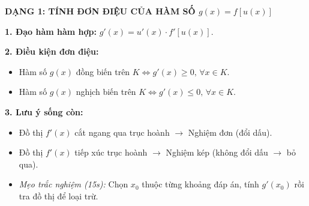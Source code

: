 \documentclass[12pt, a4paper]{article}
\begin{document}

\begin{theorybox}
    \textbf{\textcolor{deepblue}{\large DẠNG 1: TÍNH ĐƠN ĐIỆU CỦA HÀM SỐ $g(x) = f[u(x)]$}}
    \par\vspace{0.15cm}
    \textbf{1. Đạo hàm hàm hợp:} $g'(x) = u'(x) \cdot f'[u(x)]$.
    \par\vspace{0.1cm}
    \textbf{2. Điều kiện đơn điệu:}
    \begin{itemize}
        \item Hàm số $g(x)$ đồng biến trên $K \iff g'(x) \ge 0, \, \forall x \in K$.
        \item Hàm số $g(x)$ nghịch biến trên $K \iff g'(x) \le 0, \, \forall x \in K$.
    \end{itemize}
    \textbf{3. Lưu ý sống còn:}
    \begin{itemize}
        \item Đồ thị $f'(x)$ cắt ngang qua trục hoành $\rightarrow$ Nghiệm đơn (đổi dấu).
        \item Đồ thị $f'(x)$ tiếp xúc trục hoành $\rightarrow$ Nghiệm kép (không đổi dấu $\rightarrow$ bỏ qua).
        \item \textit{Mẹo trắc nghiệm (15s):} Chọn $x_0$ thuộc từng khoảng đáp án, tính $g'(x_0)$ rồi tra đồ thị để loại trừ.
    \end{itemize}
\end{theorybox}
\end{document}
